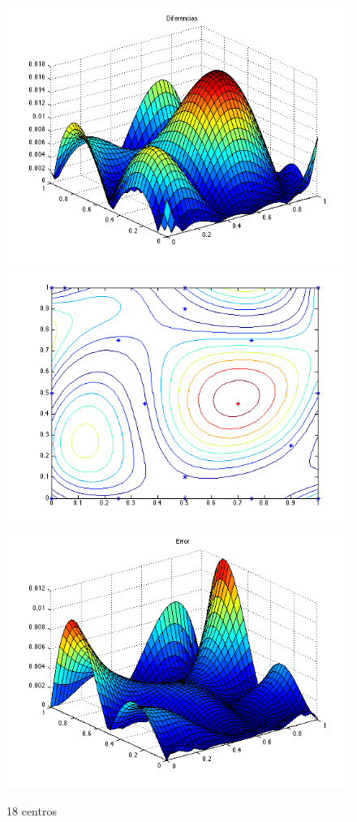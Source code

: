 \documentclass[11pt,a4paper]{article}
\begin{document}
\begin{figure}[H]
\centering

\includegraphics[scale=0.35]{diferencias18.png}
\includegraphics[scale=0.35]{centros18.png}
\includegraphics[scale=0.35]{error18.png}
\caption{18 centros}
\end{figure}
\end{document}
